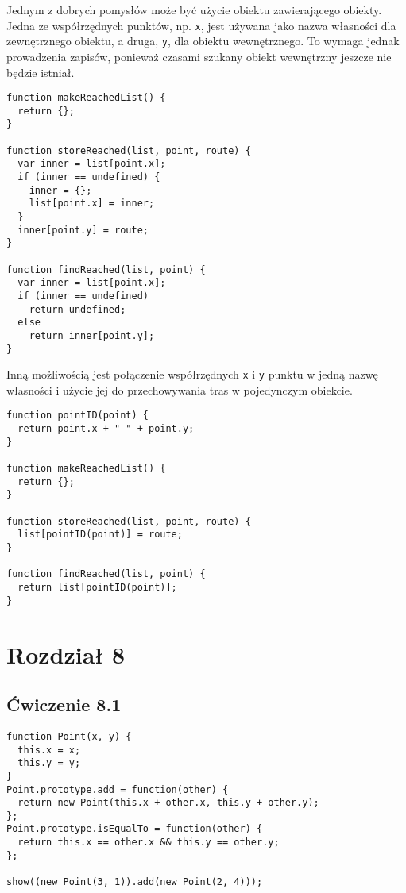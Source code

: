 Jednym z dobrych pomysłów może być użycie obiektu zawierającego obiekty. Jedna ze współrzędnych punktów, np. \texttt{x}, jest używana jako nazwa własności dla zewnętrznego obiektu, a druga, \texttt{y}, dla obiektu wewnętrznego. To wymaga jednak prowadzenia zapisów, ponieważ czasami szukany obiekt wewnętrzny jeszcze nie będzie istniał.
    
\begin{verbatim} 
function makeReachedList() {
  return {};
}

function storeReached(list, point, route) {
  var inner = list[point.x];
  if (inner == undefined) {
    inner = {};
    list[point.x] = inner;
  }
  inner[point.y] = route;
}

function findReached(list, point) {
  var inner = list[point.x];
  if (inner == undefined)
    return undefined;
  else
    return inner[point.y];
}
\end{verbatim}
    
Inną możliwością jest połączenie współrzędnych \texttt{x} i \texttt{y} punktu w jedną nazwę własności i użycie jej do przechowywania tras w pojedynczym obiekcie.
    
\begin{verbatim} 
function pointID(point) {
  return point.x + "-" + point.y;
}

function makeReachedList() {
  return {};
}

function storeReached(list, point, route) {
  list[pointID(point)] = route;
}

function findReached(list, point) {
  return list[pointID(point)];
}
\end{verbatim}

\section*{Rozdział 8}
\label{sol:8}

\subsection*{Ćwiczenie 8.1}
\label{sol:8.1}
    
\begin{verbatim} 
function Point(x, y) {
  this.x = x;
  this.y = y;
}
Point.prototype.add = function(other) {
  return new Point(this.x + other.x, this.y + other.y);
};
Point.prototype.isEqualTo = function(other) {
  return this.x == other.x && this.y == other.y;
};

show((new Point(3, 1)).add(new Point(2, 4)));
\end{verbatim}
    
